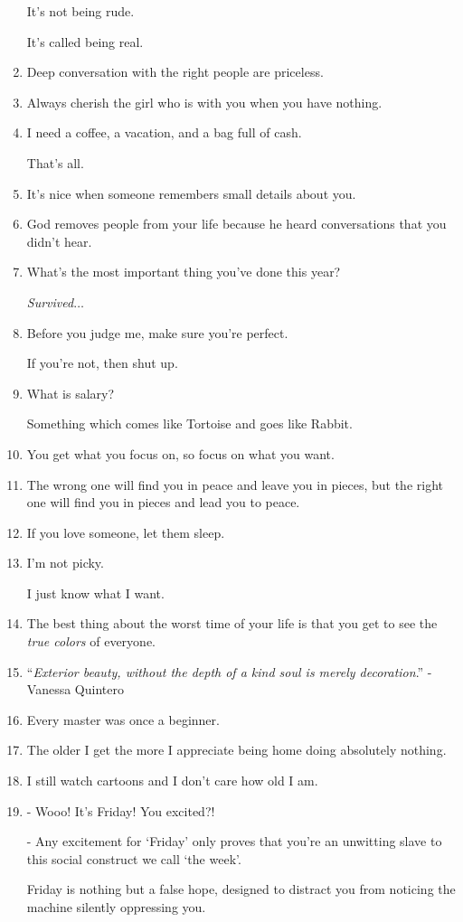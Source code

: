 \documentclass{article}
\begin{document}
\begin{enumerate}
	It's not being rude.
	
	It's called being real.
	\item Deep conversation with the right people are priceless.
	\item Always cherish the girl who is with you when you have nothing.
	\item I need a coffee, a vacation, and a bag full of cash.
	
	That's all.
	\item It's nice when someone remembers small details about you.
	\item God removes people from your life because he heard conversations that you didn't hear.
	\item What's the most important thing you've done this year?
	
	\textit{Survived}$\ldots$
	\item Before you judge me, make sure you're perfect.
	
	If you're not, then shut up.
	\item What is salary?
	
	Something which comes like Tortoise and goes like Rabbit.
	\item You get what you focus on, so focus on what you want.
	\item The wrong one will find you in peace and leave you in pieces, but the right one will find you in pieces and lead you to peace.
	\item If you love someone, let them sleep.
	\item I'm not picky.
	
	I just know what I want.
	\item The best thing about the worst time of your life is that you get to see the \textit{true colors} of everyone.
	\item ``\textit{Exterior beauty, without the depth of a kind soul is merely decoration}.'' - Vanessa Quintero
	\item Every master was once a beginner.
	\item The older I get the more I appreciate being home doing absolutely nothing.
	\item I still watch cartoons and I don't care how old I am.
	\item - Wooo! It's Friday! You excited?!
	
	- Any excitement for `Friday' only proves that you're an unwitting slave to this social construct we call `the week'.
	
	Friday is nothing but a false hope, designed to distract you from noticing the machine silently oppressing you.
	

\end{enumerate}
\end{document}
